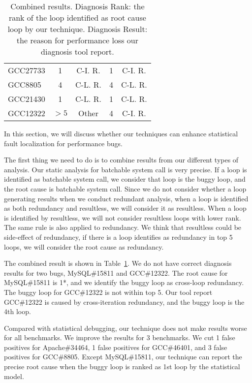 \begin{table}
\begin{tabular}{lcccc}
   GCC27733         & 1              &  C-I. R.    & 1              &  C-I. R.\\
   GCC8805          & 4              &  C-L. R.    & 4              &  C-L. R.\\
   GCC21430         & 1              &  C-L. R.    & 1              &  C-L. R.\\
   GCC12322         & $>5$           &  Other      & 4              &  C-I. R. \\
\bottomrule
   \end{tabular}
  \caption{Combined results. Diagnosis Rank: the rank of the loop identified as root cause loop by our technique. 
  Diagnosis Result: the reason for performance loss our diagnosis tool report.}
  \label{tab:6_final}
\end{table}

In this section, we will discuss whether our techniques can enhance statistical fault localization for performance bugs. 

The first thing we need to do is to combine results from our different types of analysis. 
Our static analysis for batchable system call is very precise. 
If a loop is identified as batchable system call, 
we consider that loop is the buggy loop, and the root cause is batchable system call. 
Since we do not consider whether a loop generating results when we conduct redundant analysis, 
when a loop is identified as both redundancy and resultless, we will consider it as resultless. 
When a loop is identified by resultless, we will not consider resultless loops with lower rank. 
The same rule is also applied to redundancy. 
We think that resultless could be side-effect of redundancy, 
if there is a loop identifies as redundancy in top 5 loops, 
we will consider the root cause as redundancy.  

The combined result is shown in Table~\ref{tab:6_final}. 
We do not have correct diagnosis results for two bugs, 
MySQL\#15811 and GCC\#12322. The root cause for MySQL\#15811 is 1*, 
and we identify the buggy loop as cross-loop redundancy. The buggy loop for GCC\#12322 is not within top 5.  
Our tool report GCC\#12322 is caused by cross-iteration redundancy, and the buggy loop is the 4th loop. 

Compared with statistical debugging, our technique does not make results worse for all benchmarks. 
We improve the results for 3 benchmarks. We cut 1 false positives for Apache\#34464, 1 false positives for GCC\#46401, and 3 false positives for GCC\#8805.
Except MySQL\#15811, our technique can report the precise root cause when the buggy loop is ranked as 1st loop by the statistical model. 
